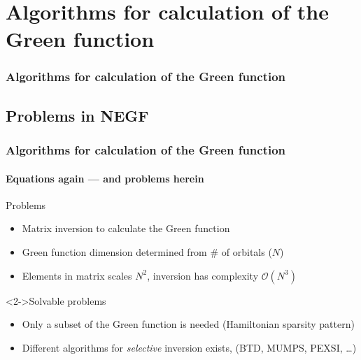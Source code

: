 \section{Algorithms for calculation of the Green function}

\begin{framenologo}
  \frametitle{Algorithms for calculation of the Green function}
  \tableofcontents[currentsection]
\end{framenologo}


\subsection{Problems in NEGF}

\begin{framenologo}
  \frametitle{Algorithms for calculation of the Green function}
  \framesubtitle{Equations again --- and problems herein}
  

  \begin{block}{Problems}
    \begin{itemize}
      \item Matrix inversion to calculate the Green function
      \item Green function dimension determined from \# of orbitals ($N$)
      \item Elements in matrix scales $N^2$, inversion has complexity $\mathcal O(N^3)$
    \end{itemize}
  \end{block}

  \begin{block}<2->{Solvable problems}
    \begin{itemize}
      \item Only a subset of the Green function is needed (Hamiltonian sparsity pattern)
      \item Different algorithms for \emph{selective} inversion exists, (BTD, MUMPS,
      PEXSI, \dots)
    \end{itemize}
  \end{block}

\end{framenologo}


